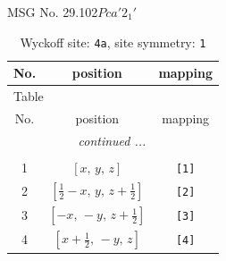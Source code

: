 \documentclass[fleqn,8pt]{jsarticle}
\begin{document}
\setcounter{MaxMatrixCols}{32}

\renewcommand{\tablename}{Table~}
\renewcommand{\figurename}{Figure~}
\begin{center}
\LARGE
MSG No. 29.102\quad$Pca'2_{1}'$
\end{center}
\renewcommand{\arraystretch}{1.2}
\begin{longtable}{ccc}
\caption{Wyckoff site: {\tt 4a}, site symmetry: {\tt 1}}
 \\
 \hline \hline
No. & position & mapping \\ \hline \endfirsthead

\multicolumn{2}{l}{\tablename\ \thetable{}} \\
 \hline \hline
No. & position & mapping \\ \hline \endhead

 \hline \hline
\multicolumn{2}{r}{\footnotesize\it continued ...} \\ \endfoot

 \hline \hline
\multicolumn{2}{r}{} \\ \endlastfoot

1 & $\left[ x,\, y,\, z \right]$ & {\tt [1]} \\ \hline
2 & $\left[ \frac{1}{2} - x,\, y,\, z + \frac{1}{2} \right]$ & {\tt [2]} \\ \hline
3 & $\left[ - x,\, - y,\, z + \frac{1}{2} \right]$ & {\tt [3]} \\ \hline
4 & $\left[ x + \frac{1}{2},\, - y,\, z \right]$ & {\tt [4]} \\
\end{longtable}
\end{document}
